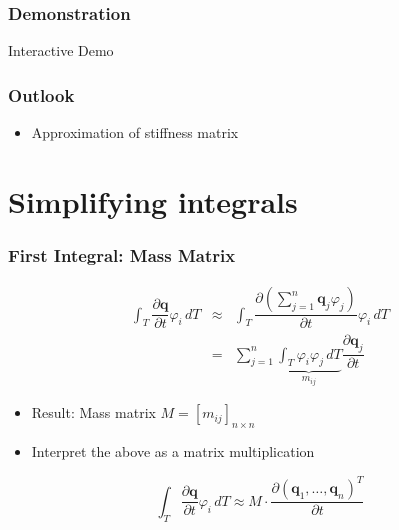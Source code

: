 \documentclass{beamer}
\newcommand{\pd}[2]{\dfrac{\partial #1}{\partial #2}}
\renewcommand{\phi}{\varphi}
\begin{document}
\begin{frame}
  \frametitle{Demonstration}
  \begin{center}
    \Large{Interactive Demo}
  \end{center}
\end{frame}

\begin{frame}
  \frametitle{Outlook}
  \begin{itemize}
  \item Approximation of stiffness matrix
  \end{itemize}
\end{frame}

\appendix{}


\section{Simplifying integrals}
\label{sec:appendix-simplifying-integrals}

\begin{frame}
  \frametitle{First Integral: Mass Matrix}

  \begin{eqnarray*}
    \int_T \pd {\mathbf{q}}{t} \phi_i \, dT & \approx &
    \int_T \pd {\left( \sum_{j=1}^n \mathbf{q}_j \phi_j \right) }{t} \phi_i \, dT \\
    & = & \sum_{j=1}^n \underbrace{\int_T \phi_i \phi_j \, dT}_{m_{ij}} \pd{\mathbf{q}_j}{t}
  \end{eqnarray*}
  
  \begin{itemize}
  \item Result: Mass matrix $M = [m_{ij}]_{n \times n}$
  \item Interpret the above as a matrix multiplication
  \end{itemize}

  \begin{equation*}
    \int_T \pd {\mathbf{q}}{t} \phi_i \, dT \approx
    M \cdot \pd{
      \left( \mathbf{q}_1 , \dots , \mathbf{q}_n  \right)^T }
    {t}
  \end{equation*}
\end{frame}
\end{document}
